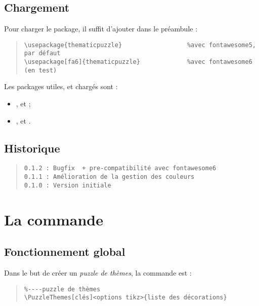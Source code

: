 \documentclass[11pt,a4paper]{ltxdoc}
\begin{document}
\subsection{Chargement}

Pour charger le package, il suffit d'ajouter dans le préambule :

\begin{quote}
\begin{verbatim}
\usepackage{thematicpuzzle}                  %avec fontawesome5, par défaut
\usepackage[fa6]{thematicpuzzle}             %avec fontawesome6 (en test)
\end{verbatim}
\end{quote}

Les packages utiles, et chargés sont :

\begin{itemize}
	\item {},  et  ;
	\item {},  et .
\end{itemize}

\vfill

\subsection{Historique}

\begin{quote}
\begin{verbatim}
0.1.2 : Bugfix  + pre-compatibilité avec fontawesome6
0.1.1 : Amélioration de la gestion des couleurs
0.1.0 : Version initiale
\end{verbatim}
\end{quote}

\pagebreak

\section{La commande}

\subsection{Fonctionnement global}

Dans le but de créer un \textit{puzzle de thèmes}, la commande est :

\begin{quote}
\begin{verbatim}
%----puzzle de thèmes
\PuzzleThemes[clés]<options tikz>{liste des décorations}
\end{verbatim}
\end{quote}
\end{document}
